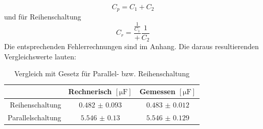 \begin{equation*}
	C_p = C_1 + C_2
\end{equation*}
und für Reihenschaltung
\begin{equation*}
	C_r = \frac{\frac{1}{C_1}}+{\frac{1}{C_2}}
\end{equation*}
Die entsprechenden Fehlerrechnungen sind im Anhang. Die daraus resultierenden Vergleichswerte lauten:
\begin{table}[H]
	\centering
	\begin{tabular}{r|cc}
		 & Rechnerisch $ [\si{\micro\farad}] $ & Gemessen $ [\si{\micro\farad}] $ \\\hline
		 Reihenschaltung & $ \num{0.482(0093)} $ & $ \num{0.483(0012)} $ \\
		 Parallelschaltung & $ \num{5.546(0130)} $ & $ \num{5.546(0129)} $
	\end{tabular}
	\caption{Vergleich mit Gesetz für Parallel- bzw. Reihenschaltung}
\end{table}

